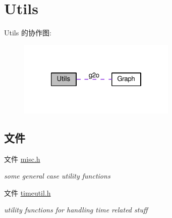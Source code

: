 \hypertarget{group__utils}{\section{Utils}
\label{group__utils}
}
Utils 的协作图\-:
\nopagebreak
\begin{figure}[H]
\begin{center}
\leavevmode
\includegraphics[width=214pt]{group__utils}
\end{center}
\end{figure}
\subsection*{文件}
\begin{DoxyCompactItemize}
\item 
文件 \hyperlink{misc_8h}{misc.\-h}
\begin{DoxyCompactList}\small\item\em some general case utility functions \end{DoxyCompactList}\item 
文件 \hyperlink{timeutil_8h}{timeutil.\-h}
\begin{DoxyCompactList}\small\item\em utility functions for handling time related stuff \end{DoxyCompactList}\end{DoxyCompactItemize}
